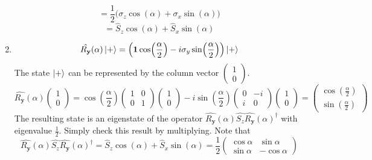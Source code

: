 \begin{sol}
\begin{enumerate}[label=\textbf{(\alph*)}]
\begin{equation}
\end{equation}
\begin{equation}
	=\frac{1}{2}\big(\sigma_z\cos(\alpha)+\sigma_x\sin(\alpha)\big)
\end{equation} \begin{equation}
	=\hat S_z\cos(\alpha)+\hat S_x\sin(\alpha)
\end{equation}  
\item
\begin{equation}
	\hat{R_\mathbf{y}}(\alpha)\ket{+}=\Big(\mathbf{1}\cos(\frac{\alpha}{2})-i\sigma_y\sin(\frac{\alpha}{2})\Big)\ket{+}
\end{equation} 
The state $\ket{+}$ can be represented by the column vector $\begin{pmatrix}1\\0\end{pmatrix}$.
\begin{equation}
	\hat{R_\mathbf{y}}(\alpha)\begin{pmatrix}1\\0\end{pmatrix}=\cos(\frac{\alpha}{2})\begin{pmatrix}1&0\\0&1\end{pmatrix}\begin{pmatrix}1\\0\end{pmatrix}-i\sin(\frac{\alpha}{2})\begin{pmatrix}0&-i\\i&0\end{pmatrix}\begin{pmatrix}1\\0\end{pmatrix}=\begin{pmatrix}\cos(\frac{\alpha}{2})\\\sin(\frac{\alpha}{2})\end{pmatrix}
\end{equation} 
The resulting state is an eigenstate of the operator $\hat{R_\mathbf{y}}(\alpha)\hat{S_z}\hat{R_\mathbf{y}}(\alpha)^\dagger$ with eigenvalue $\frac{1}{2}$. Simply check this result by multiplying. Note that \begin{equation}
	\hat{R_\mathbf{y}}(\alpha)\hat{S_z}\hat{R_\mathbf{y}}(\alpha)^\dagger=\hat S_z\cos(\alpha)+\hat S_x\sin(\alpha)=\frac{1}{2}\begin{pmatrix}\cos\alpha&\sin\alpha\\\sin\alpha&-\cos\alpha\end{pmatrix}

\end{equation}
\end{enumerate}
\end{sol}
